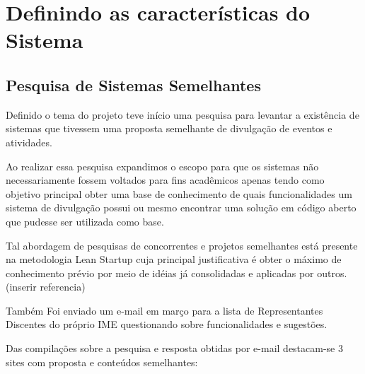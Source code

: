 \section{Definindo as características do Sistema}
\subsection{Pesquisa de Sistemas Semelhantes}
\par Definido o tema do projeto teve início uma pesquisa para levantar a existência de sistemas que tivessem uma proposta semelhante de divulgação de eventos e atividades.
\par Ao realizar essa pesquisa expandimos o escopo para que os sistemas não necessariamente fossem voltados para fins acadêmicos apenas tendo como objetivo principal obter uma base de conhecimento de quais funcionalidades um sistema de divulgação possui ou mesmo encontrar uma  solução em código aberto que pudesse ser utilizada como base.
\par Tal abordagem de pesquisas de concorrentes e projetos semelhantes está presente na metodologia Lean Startup cuja principal justificativa é obter o máximo de conhecimento prévio por meio de idéias já consolidadas e aplicadas por outros. (inserir referencia)
 \par Também Foi enviado um e-mail em março para a lista de Representantes Discentes do próprio IME questionando sobre funcionalidades e sugestões. 
\par  Das compilações sobre a pesquisa e resposta obtidas por e-mail destacam-se 3 sites com proposta e conteúdos semelhantes:

